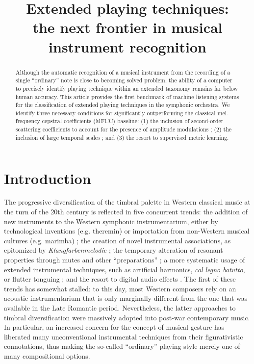 \documentclass{article}
\title{Extended playing techniques: \\
the next frontier in musical instrument recognition}
\makeatletter
\newcommand*{\eg}{e.g.\@\xspace}
\makeatother
\begin{document}
%
\maketitle
%
\begin{abstract}
Although the automatic recognition of a musical instrument from the recording of a single ``ordinary'' note is close to becoming solved problem, the ability of a computer to precisely identify playing technique within an extended taxonomy remains far below human accuracy.
This article provides the first benchmark of machine listening systems for the classification of extended playing techniques in the symphonic orchestra.
We identify three necessary conditions for significantly outperforming the classical mel-frequency cepstral coefficients (MFCC) baseline:
(1) the inclusion of second-order scattering coefficients to account for the presence of amplitude modulations ;
(2) the inclusion of large temporal scales ; and
(3) the resort to supervised metric learning.
\end{abstract}
%
\section{Introduction}\label{sec:introduction}
The progressive diversification of the timbral palette in Western classical music at the turn of the 20th century is reflected in five concurrent trends:
the addition of new instruments to the Western symphonic instrumentarium, either by technological inventions (\eg theremin) or importation from non-Western musical cultures (\eg marimba) \cite{sachs2012book};
the creation of novel instrumental associations, as epitomized by \emph{Klangfarbenmelodie} \cite{schoenberg2010book};
the temporary alteration of resonant properties through mutes and other ``preparations'' \cite{dianova2007phd};
a more systematic usage of extended instrumental techniques, such as artificial harmonics, \emph{col legno batutto}, or flutter tonguing \cite{kostka2016book};
and the resort to digital audio effects \cite{zolzer2011dafx}.
The first of these trends has somewhat stalled: to this day, most Western composers rely on an acoustic instrumentarium that is only marginally different from the one that was available in the Late Romantic period.
Nevertheless, the latter approaches to timbral diversification were massively adopted into post-war contemporary music.
In particular, an increased concern for the concept of musical gesture \cite{godoy2009book} has liberated many unconventional instrumental techniques from their figurativistic connotations, thus making the so-called ``ordinary'' playing style merely one of many compositional options.
\end{document}
